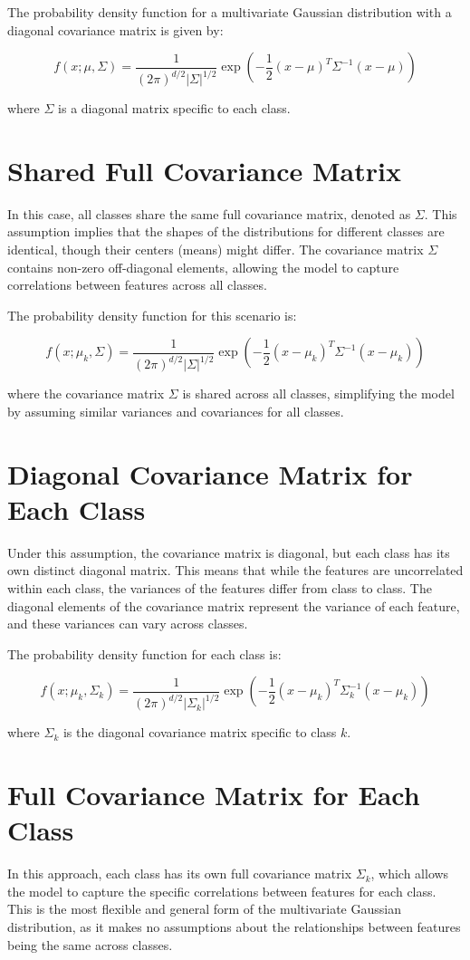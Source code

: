 \documentclass[conference]{IEEEtran}
\begin{document}
	The probability density function for a multivariate Gaussian distribution with a diagonal covariance matrix is given by:
	
	\[
	f(x; \mu, \Sigma) = \frac{1}{(2\pi)^{d/2} |\Sigma|^{1/2}} \exp\left(-\frac{1}{2} (x - \mu)^T \Sigma^{-1} (x - \mu)\right)
	\]
	
	where \( \Sigma \) is a diagonal matrix specific to each class.
	
	\section{Shared Full Covariance Matrix}
	In this case, all classes share the same full covariance matrix, denoted as \( \Sigma \). This assumption implies that the shapes of the distributions for different classes are identical, though their centers (means) might differ. The covariance matrix \( \Sigma \) contains non-zero off-diagonal elements, allowing the model to capture correlations between features across all classes.
	
	The probability density function for this scenario is:
	
	\[
	f(x; \mu_k, \Sigma) = \frac{1}{(2\pi)^{d/2} |\Sigma|^{1/2}} \exp\left(-\frac{1}{2} (x - \mu_k)^T \Sigma^{-1} (x - \mu_k)\right)
	\]
	
	where the covariance matrix \( \Sigma \) is shared across all classes, simplifying the model by assuming similar variances and covariances for all classes.
	
	\section{Diagonal Covariance Matrix for Each Class}
	Under this assumption, the covariance matrix is diagonal, but each class has its own distinct diagonal matrix. This means that while the features are uncorrelated within each class, the variances of the features differ from class to class. The diagonal elements of the covariance matrix represent the variance of each feature, and these variances can vary across classes.
	
	The probability density function for each class is:
	
	\[
	f(x; \mu_k, \Sigma_k) = \frac{1}{(2\pi)^{d/2} |\Sigma_k|^{1/2}} \exp\left(-\frac{1}{2} (x - \mu_k)^T \Sigma_k^{-1} (x - \mu_k)\right)
	\]
	
	where \( \Sigma_k \) is the diagonal covariance matrix specific to class \( k \).
	
	\section{Full Covariance Matrix for Each Class}
	In this approach, each class has its own full covariance matrix \( \Sigma_k \), which allows the model to capture the specific correlations between features for each class. This is the most flexible and general form of the multivariate Gaussian distribution, as it makes no assumptions about the relationships between features being the same across classes.
	
\end{document}
